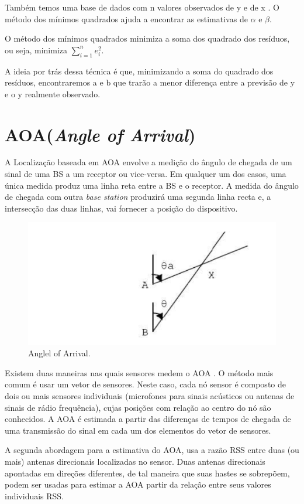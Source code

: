 Também temos uma base de dados com n valores observados de y e de x . 
O método dos mínimos quadrados ajuda a encontrar as estimativas de $\alpha$ e $\beta$.

O método dos mínimos quadrados minimiza a soma dos quadrado dos resíduos, ou seja, minimiza $\sum_{i=1}^n e_i^2$.

A ideia por trás dessa técnica é que, minimizando a soma do quadrado dos resíduos, encontraremos a e b que trarão 
a menor diferença entre a previsão de y e o y realmente observado.

\section{AOA(\textit{Angle of Arrival})}
A Localização baseada em AOA envolve a medição do ângulo de chegada de um sinal de uma BS
a um receptor ou vice-versa. Em qualquer um dos casos, uma única medida produz uma linha reta 
entre a BS e o receptor. A medida do ângulo de chegada com outra \textit{base station}
produzirá uma segunda linha recta e, a intersecção das duas linhas, vai fornecer a posição
do dispositivo\cite{aoa3}.
	\begin{figure}[hb]
	\centering
	\includegraphics[scale=0.5]{images/aoa.png}
	\caption{Anglel of Arrival\cite{aoa3}. }
	\label{fig:aoa}
	\end{figure}
	
      Existem duas maneiras nas quais sensores medem o AOA \cite{aoa}. O método mais
comum é usar um vetor de sensores. Neste caso, cada nó sensor é
composto de dois ou mais sensores individuais (microfones para sinais acústicos ou antenas de sinais de rádio frequência),
cujas posições com relação ao centro do nó são conhecidos. A AOA é estimada a partir
das diferenças de tempos de chegada de uma transmissão do sinal em cada um dos elementos do vetor de sensores.

  A segunda abordagem para a estimativa do AOA, usa a razão RSS entre duas (ou
mais) antenas direcionais localizadas no sensor. Duas antenas direcionais apontadas em
direções diferentes, de tal maneira que suas hastes se sobrepõem, podem ser usadas para
estimar a AOA partir da relação entre seus valores individuais RSS.

